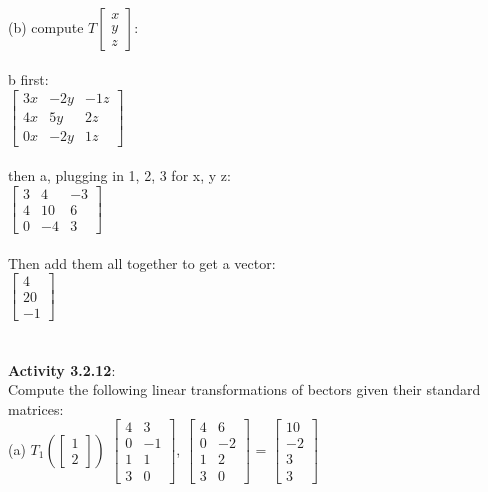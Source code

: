 \documentclass{article}
\begin{document}
\\
(b) compute $T\begin{bmatrix} x \\ y \\z \end{bmatrix}$: \\
\\
b first:\\
$\left[ \begin{matrix} 3x & -2y & -1z \\ 4x & 5y & 2z \\ 0x & -2y & 1z \end{matrix} \right]$\\
\\
then a, plugging in 1, 2, 3 for x, y z:\\
$\left[ \begin{matrix} 3 & 4 & -3 \\ 4 & 10 & 6 \\ 0 & -4 & 3 \end{matrix} \right]$\\
\\
Then add them all together to get a vector:\\
$\left[ \begin{matrix} 4\\ 20 \\ -1 \end{matrix} \right]$\\
\\
\\
\noindent \textbf{Activity 3.2.12}:\\
Compute the following linear transformations of bectors given their standard matrices:\\
(a) $T_{1} \left( \left[ \begin{matrix} 
1\\2 
\end{matrix} \right] \right)$ 
$\left[\begin{matrix}
4 & 3 \\0 & -1 \\1 & 1\\3 & 0
\end{matrix}\right]$, 
$\left[\begin{matrix}
4 & 6 \\0 & -2 \\1 & 2\\3 & 0
\end{matrix}\right]$ = 
$\left[\begin{matrix}
10 \\ -2 \\3\\3 \end{matrix}\right]$\\
\end{document}
